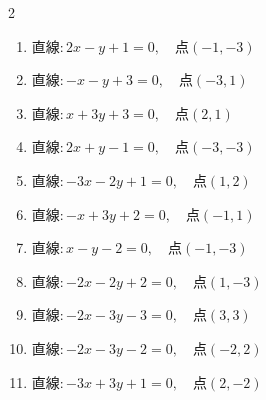 \begin{multicols}{2}
\begin{enumerate}

  \item $直線:2x-y+1=0,\quad 点 ( -1, -3 )$


  \item $直線:-x-y+3=0,\quad 点 ( -3, 1 )$


  \item $直線:x+3y+3=0,\quad 点 ( 2, 1 )$


  \item $直線:2x+y-1=0,\quad 点 ( -3, -3 )$


  \item $直線:-3x-2y+1=0,\quad 点 ( 1, 2 )$


\columnbreak %

  \item $直線:-x+3y+2=0,\quad 点 ( -1, 1 )$


  \item $直線:x-y-2=0,\quad 点 ( -1, -3 )$

        \phantom{$\displaystyle 距離 : 0$}

  \item $直線:-2x-2y+2=0,\quad 点 ( 1, -3 )$


  \item $直線:-2x-3y-3=0,\quad 点 ( 3, 3 )$


  \item $直線:-2x-3y-2=0,\quad 点 ( -2, 2 )$


  \item $直線:-3x+3y+1=0,\quad 点 ( 2, -2 )$



\end{enumerate}
\end{multicols}
